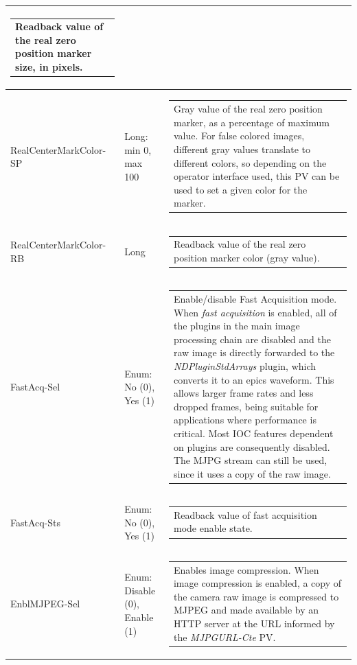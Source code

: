 \documentclass[openany]{article}
\begin{document}
\begin{longtable}{| m{3.0cm} m{4.5cm}  m{7.0cm} |}
\begin{tabular}{@{}m{6cm}@{}}
		Readback value of the real zero position marker size, in pixels.
            \end{tabular} \hypertarget{pv:real-center-mark-color}{}\\ \hline
        RealCenterMarkColor-SP & Long: min 0, max 100 & \begin{tabular}{@{}m{6cm}@{}}
                Gray value of the real zero position marker, as a percentage of maximum value. For false colored images,
                different gray values translate to different colors, so depending
                on the operator interface used, this PV can be used to set a given
                color for the marker.
            \end{tabular} \\ \hline
        RealCenterMarkColor-RB & Long & \begin{tabular}{@{}m{6cm}@{}}
                Readback value of the real zero position marker color (gray value).
            \end{tabular} \hypertarget{pv:fast-acq}{}\\ \hline
        FastAcq-Sel & Enum: No (0), Yes (1) & \begin{tabular}{@{}m{6cm}@{}}
                Enable/disable Fast Acquisition mode. When \emph{fast acquisition} is enabled, all of the plugins in the main image processing chain are disabled and the raw image is directly forwarded to the \emph{NDPluginStdArrays} plugin, which converts it to an epics waveform. This allows larger frame rates and less dropped frames, being suitable for applications where performance is critical. Most IOC features dependent on plugins are consequently disabled. The MJPG stream can still be used, since it uses a copy of the raw image.
            \end{tabular} \\ \hline
        FastAcq-Sts & Enum: No (0), Yes (1) & \begin{tabular}{@{}m{6cm}@{}}
                Readback value of fast acquisition mode enable state.
            \end{tabular} \hypertarget{pv:enbl-mjpeg}{}\\ \hline
        EnblMJPEG-Sel & Enum: Disable (0), Enable (1) & \begin{tabular}{@{}m{6cm}@{}}
                Enables image compression. When image compression is enabled, a copy of the camera raw image is compressed to MJPEG and made available by an HTTP server at the URL informed by the \emph{MJPGURL-Cte} PV.

\end{tabular}
\end{longtable}
\end{document}
